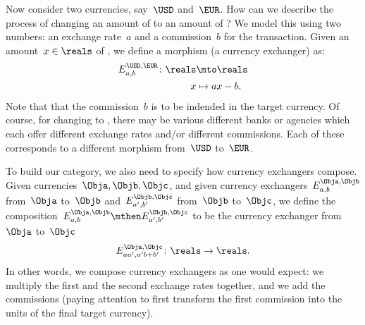 Now consider two currencies, say~$\USD$ and~$\EUR$.
How can we describe the process of changing an amount of \USD to an amount of \EUR?
We model this using two numbers: an exchange rate~$a$ and a commission~$b$ for the transaction.
Given an amount~$x \in \reals$ of \USD, we define a morphism (a currency exchanger) as:
\begin{equation*}
    \label{eq:def_curr_ex}
    \begin{aligned}
        E_{a,b}^{\USD,\EUR} \colon \reals &\mto \reals \\
        x &\mapsto ax - b.
    \end{aligned}
\end{equation*}
Note that that the commission~$b$ is to be indended in the target currency.
Of course, for changing \USD to \EUR, there may be various different banks or agencies which each offer different exchange rates and/or different commissions.
Each of these corresponds to a different morphism from~$\USD$ to~$\EUR$.


To build our category, we also need to specify how currency exchangers compose.
Given currencies~$\Obja, \Objb, \Objc$, and given currency exchangers~$E_{a,b}^{\Obja,\Objb}$ from~$\Obja$ to~$\Objb$ and~$E_{a',b'}^{\Objb,\Objc}$ from~$\Objb$ to~$\Objc$,
we define the composition~$E_{a,b}^{\Obja,\Objb} \mthen E_{a',b'}^{\Objb,\Objc}$ to be the currency exchanger from~$\Obja$ to~$\Objc$
\begin{equation}
    \label{eq:comp-law-curr}
    E_{aa',a'b + b'}^{\Obja,\Objc} \colon \reals \to \reals.
\end{equation}
In other words, we compose currency exchangers as one would expect: we multiply the first and the second exchange rates together, and we add the commissions (paying attention to first transform the first commission into the units of the final target currency).

